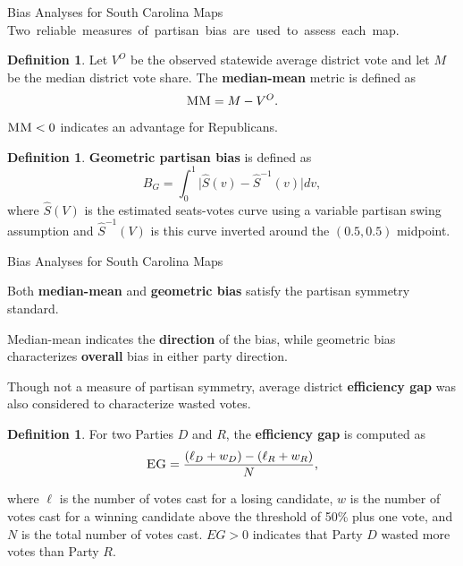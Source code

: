 \documentclass[xcolor=dvipsnames,table]{beamer}
\theoremstyle{plain}
\theoremstyle{definition}
\newtheorem{defn}[thm]{Definition}
\begin{document}
\begin{frame}{Bias Analyses for South Carolina Maps}
		\mbox{Two reliable measures of partisan bias are used to assess each map.}
		
		\begin{defn}
		\small Let $V^O$ be the observed statewide average district vote and let $M$ be the median district vote share. The \textbf{median-mean} metric is defined as $$\textsc{MM}=M-V^O.$$
		$\textsc{MM}<0$ indicates an advantage for Republicans.
		\end{defn}
		
		\begin{defn}
	\small	\textbf{Geometric partisan bias} is defined as 
		$$B_G=\int_0^1\Big|\widehat{S}(v)-\widehat{S}^{-1}(v)\Big|dv,$$
		where $\widehat{S}(V)$ is the estimated seats-votes curve using a variable partisan swing assumption and $\widehat{S}^{-1}(V)$ is this curve inverted around the $(0.5,0.5)$ midpoint.
		\end{defn}
\end{frame}


\begin{frame}{Bias Analyses for South Carolina Maps}

Both \textbf{median-mean} and \textbf{geometric bias} satisfy the partisan symmetry standard.

\vspace{3mm}

Median-mean indicates the \textbf{direction} of the bias, while geometric bias characterizes \textbf{overall} bias in either party direction.

\vspace{3mm}

Though not a measure of partisan symmetry, average district \textbf{efficiency gap} was also considered to characterize wasted votes. 

\vspace{2mm}

\begin{defn}
\small For two Parties $D$ and $R$, the \textbf{efficiency gap} is computed as
$$\textsc{EG}=\frac{\left(\ell_D+w_D\right)-\left(\ell_R+w_R\right)}{N},$$

where $\ell$ is the number of votes cast for a losing candidate, $w$ is the number of votes cast for a winning candidate above the threshold of 50\% plus one vote, and $N$ is the total number of votes cast. $EG>0$ indicates that Party $D$ wasted more votes than Party $R$.
\end{defn}

\end{frame}
\end{document}
